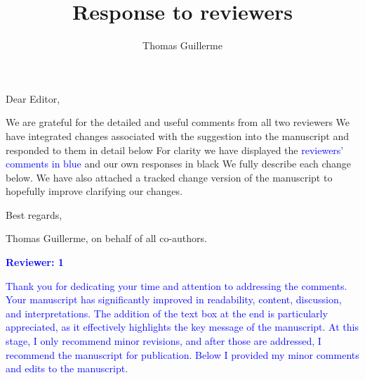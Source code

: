 \documentclass[
]{article}
\title{Response to reviewers}
\author{Thomas Guillerme}
\begin{document}
\maketitle


Dear Editor,

We are grateful for the detailed and useful comments from all two reviewers
We have integrated changes associated with the suggestion into the manuscript and responded to them in detail below
For clarity we have displayed the \textcolor{blue}{reviewers' comments in blue} and our own responses in black
We fully describe each change below.
We have also attached a tracked change version of the manuscript to hopefully improve clarifying our changes.

Best regards,

Thomas Guillerme, on behalf of all co-authors.








\textcolor{blue}{\textbf{Reviewer: 1}}

\textcolor{blue}{Thank you for dedicating your time and attention to addressing the comments. Your manuscript has significantly improved in readability, content, discussion, and interpretations. The addition of the text box at the end is particularly appreciated, as it effectively highlights the key message of the manuscript. At this stage, I only recommend minor revisions, and after those are addressed, I recommend the manuscript for publication. Below I provided my minor comments and edits to the manuscript.}
\end{document}
